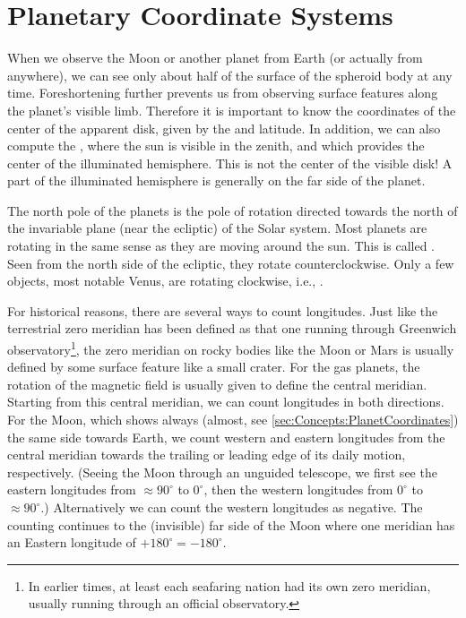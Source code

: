 \section{Planetary Coordinate Systems}
\label{sec:Nomenclature:CoordinateSystems}

When we observe the Moon or another planet from Earth (or actually
from anywhere), we can see only about half of the surface of the
spheroid body at any time. Foreshortening further prevents us from
observing surface features along the planet's visible limb. Therefore
it is important to know the coordinates of the center of the apparent
disk, given by the  and latitude. In
addition, we can also compute the , where
the sun is visible in the zenith, and which provides the center of the
illuminated hemisphere. This is not the center of the visible disk! A
part of the illuminated hemisphere is generally on the far side of the
planet.

The north pole of the planets is the pole of rotation directed towards
the north of the invariable plane (near the ecliptic) of the Solar
system. Most planets are rotating in the same sense as they are moving
around the sun. This is called
. Seen from the north side of
the ecliptic, they rotate counterclockwise. Only a few objects, most
notable Venus, are rotating clockwise, i.e.,
.

For historical reasons, there are several ways to count
longitudes. Just like the terrestrial zero meridian has been defined
as that one running through Greenwich observatory\footnote{In earlier
  times, at least each seafaring nation had its own zero meridian,
  usually running through an official observatory.}, the zero meridian
on rocky bodies like the Moon or Mars is usually defined by some
surface feature like a small crater. For the gas planets, the rotation
of the magnetic field is usually given to define the central
meridian. Starting from this central meridian, we can count longitudes
in both directions. For the Moon, which shows always (almost, see
\ref{sec:Concepts:PlanetCoordinates}) the same side towards Earth, we
count western and eastern longitudes from the central meridian towards
the trailing or leading edge of its daily motion,
respectively. (Seeing the Moon through an unguided telescope, we first
see the eastern longitudes from $\approx 90^\circ$ to $0^\circ$, then
the western longitudes from $0^\circ$ to $\approx 90^\circ$.)
Alternatively we can count the western longitudes as negative. The
counting continues to the (invisible) far side of the Moon where one
meridian has an Eastern longitude of $+180^\circ=-180^\circ$.

